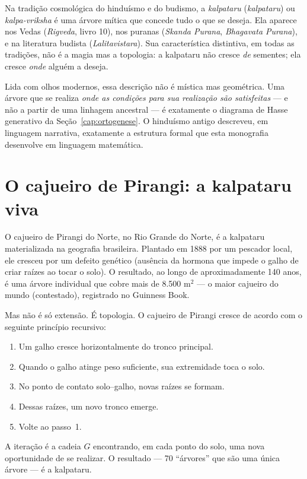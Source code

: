 \documentclass[12pt,a4paper,twoside]{book}
\theoremstyle{plain}
\theoremstyle{definition}
\theoremstyle{definition}
\begin{document}
Na tradição cosmológica do hinduísmo e do budismo, a \emph{kalpataru}
(\emph{kalpataru}) ou \emph{kalpa-vriksha} é uma árvore mítica
que concede tudo o que se deseja. Ela aparece nos Vedas (\emph{Rigveda},
livro 10), nos puranas (\emph{Skanda Purana}, \emph{Bhagavata Purana}),
e na literatura budista (\emph{Lalitavistara}). Sua característica
distintiva, em todas as tradições, não é a magia mas a topologia: a
kalpataru não cresce \emph{de} sementes; ela cresce \emph{onde} alguém
a deseja.

Lida com olhos modernos, essa descrição não é mística mas geométrica.
Uma árvore que se realiza \emph{onde as condições para sua realização
são satisfeitas} --- e não a partir de uma linhagem ancestral --- é
exatamente o diagrama de Hasse generativo da Seção~\ref{cap:ortogenese}.
O hinduísmo antigo descreveu, em linguagem narrativa, exatamente a
estrutura formal que esta monografia desenvolve em linguagem matemática.

\section{O cajueiro de Pirangi: a kalpataru viva}

O cajueiro de Pirangi do Norte, no Rio Grande do Norte, é a kalpataru
materializada na geografia brasileira. Plantado em 1888 por um pescador
local, ele cresceu por um defeito genético (ausência da hormona que
impede o galho de criar raízes ao tocar o solo). O resultado, ao longo
de aproximadamente 140 anos, é uma árvore individual que cobre mais de
8.500 m$^{2}$ --- o maior cajueiro do mundo (contestado), registrado no Guinness Book.

Mas não é só extensão. É topologia. O cajueiro de Pirangi cresce de
acordo com o seguinte princípio recursivo:
\begin{enumerate}
  \item Um galho cresce horizontalmente do tronco principal.
  \item Quando o galho atinge peso suficiente, sua extremidade toca o
        solo.
  \item No ponto de contato solo--galho, novas raízes se formam.
  \item Dessas raízes, um novo tronco emerge.
  \item Volte ao passo~1.
\end{enumerate}
A iteração é a cadeia $G$ encontrando, em cada ponto do solo, uma nova
oportunidade de se realizar. O resultado --- 70 ``árvores'' que são uma
única árvore --- é a kalpataru.
\end{document}
